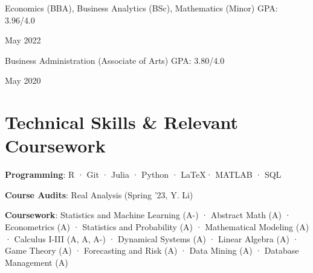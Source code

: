 \documentclass[a4paper,20pt]{article}
\begin{document}
    	\begin{minipage}{.75\linewidth} \begin{flushleft}
    		Economics (BBA), Business Analytics (BSc), Mathematics (Minor) GPA: 3.96/4.0\\
    	\end{flushleft} \end{minipage}
    \hfill 
    \begin{minipage}{.20\linewidth}\begin{flushright}
    	 May 2022
    	\end{flushright}\end{minipage} 
	 
   		\begin{minipage}{.85\linewidth} \begin{flushleft}
    		Business Administration (Associate of Arts) GPA: 3.80/4.0\\
    	\end{flushleft} \end{minipage}
    \hfill 
    \begin{minipage}{.13\linewidth}\begin{flushright}
    	 May 2020
    	\end{flushright}\end{minipage}

\vspace{0pt}

\printbibliography[title={Publications}, type=article, resetnumbers=true]

\printbibliography[title={Software Packages \& Working Papers}, type=inproceedings, resetnumbers=true]

\vspace{-5pt}
\section{Technical Skills \& Relevant Coursework}
\vspace{5pt}
     \begin{description}[font=$\bullet$]
     \vspace{-5pt}
\item{\textbf{Programming}: R · Git · Julia · Python · \LaTeX · MATLAB · SQL}
     \vspace{-7pt}
\item{\textbf{Course Audits}: Real Analysis (Spring '23, Y. Li)}
     \vspace{-7pt}
\item{\textbf{Coursework}: Statistics and Machine Learning (A-) · Abstract Math (A) · Econometrics (A) · Statistics and Probability (A) · Mathematical Modeling (A) · Calculus I-III (A, A, A-) · Dynamical Systems (A) · Linear Algebra (A) · Game Theory (A) · Forecasting and Risk (A) · Data Mining (A) · Database Management (A)}
    \end{description}
    
\end{document}
